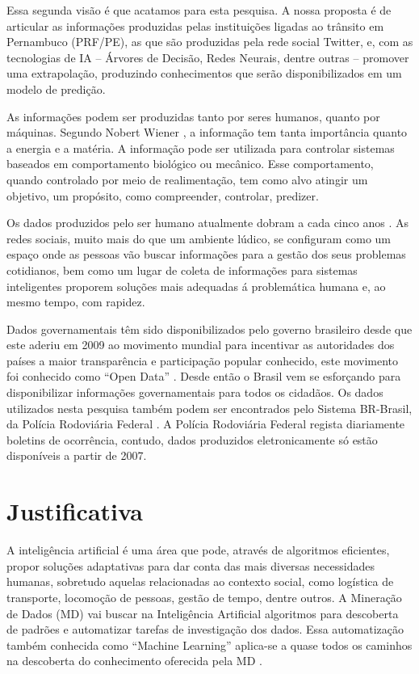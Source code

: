 Essa segunda visão é que acatamos para esta pesquisa. A nossa proposta é de articular as informações produzidas pelas instituições ligadas ao trânsito em Pernambuco (PRF/PE), as que são produzidas pela rede social Twitter, e, com as tecnologias de IA -- Árvores de Decisão, Redes Neurais, dentre outras -- promover uma extrapolação, produzindo conhecimentos que serão disponibilizados em um modelo de predição.

As informações podem ser produzidas tanto por seres humanos, quanto por máquinas. Segundo Nobert Wiener \cite{Salles2007}, a informação tem tanta importância quanto a energia e a matéria. A informação pode ser utilizada para controlar sistemas baseados em comportamento biológico ou mecânico. Esse comportamento, quando controlado por meio de realimentação, tem como alvo atingir um objetivo, um propósito, como compreender, controlar, predizer.

Os dados produzidos pelo ser humano atualmente dobram a cada cinco anos \cite{bigdataQualquerUm}. As redes sociais, muito mais do que um ambiente lúdico, se configuram como um espaço onde as pessoas vão buscar informações para a gestão dos seus problemas cotidianos, bem como um lugar de coleta de informações para sistemas inteligentes proporem soluções mais adequadas á problemática humana e, ao mesmo tempo, com rapidez.

Dados governamentais têm sido disponibilizados pelo governo brasileiro desde que este aderiu em 2009 ao movimento mundial para incentivar as autoridades dos países a maior transparência e participação popular conhecido, este movimento foi conhecido como ``Open Data'' \cite{DadosGoverno}. Desde então o Brasil vem se esforçando para disponibilizar informações governamentais para todos os cidadãos. Os dados utilizados nesta pesquisa também podem ser encontrados pelo Sistema BR-Brasil, da Polícia Rodoviária Federal \cite{Br-Brasil} \cite{Dados-BR}. A Polícia Rodoviária Federal regista diariamente boletins de ocorrência, contudo, dados produzidos eletronicamente só estão disponíveis a partir de 2007.


\section{Justificativa}

A inteligência artificial é uma área que pode, através de algoritmos eficientes, propor soluções adaptativas para dar conta das mais diversas necessidades humanas, sobretudo aquelas relacionadas ao contexto social, como logística de transporte, locomoção de pessoas, gestão de tempo, dentre outros. A Mineração de Dados (MD) vai buscar na Inteligência Artificial algoritmos para descoberta de padrões e automatizar tarefas de investigação dos dados. Essa automatização também conhecida como ``Machine Learning'' aplica-se a quase todos os caminhos na descoberta do conhecimento oferecida pela MD \cite{Ben-David2014}.
 
